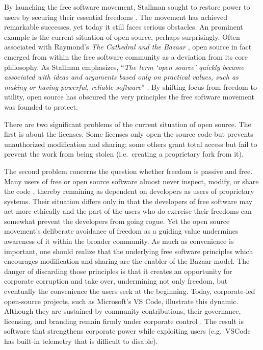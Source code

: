 \documentclass[10pt]{article}
\begin{document}
By launching the free software movement, Stallman sought to restore power to
users by securing their essential freedoms \cite[Essay~1]{stallman.essays}. The
movement has achieved remarkable successes, yet today it still faces serious
obstacles. An prominent example is the current situation of open source,
perhaps surprisingly. Often associated with Raymond’s \emph{The Cathedral and
the Bazaar} \cite{cathedral.bazaar}, open source in fact emerged from within
the free software community as a deviation from its core philosophy. As
Stallman emphasizes, ``\emph{The term `open source' quickly became associated
with ideas and arguments based only on practical values, such as making or
having powerful, reliable software}'' \cite[Essay~14]{stallman.essays}. By
shifting focus from freedom to utility, open source has obscured the very
principles the free software movement was founded to protect.

There are two significant problems of the current situation of open source. The
first is about the licenses. Some licenses only open the source code but
prevents unauthorized modification and sharing; some others grant total
access but fail to prevent the work from being stolen (i.e.\ creating a
proprietary fork from it). 

The second problem concerns the question whether freedom is passive and free.
Many users of free or open source software almost never inspect, modify, or
share the code \cite{open.source.contrib}, thereby remaining as dependent on
developers as users of proprietary systems. Their situation differs only in
that the developers of free software may act more ethically and the part of the
users who do exercise their freedoms can somewhat prevent the developers from
going rogue. Yet the open source movement's deliberate avoidance of freedom as
a guiding value undermines awareness of it within the broader community.  As
much as convenience is important, one should realize that the underlying free
software principles which encourages modification and sharing are the enabler
of the Bazaar model. The danger of discarding those principles is that it
creates an opportunity for corporate corruption and take over, undermining not
only freedom, but eventually the convenience the users seek at the beginning.
Today, corporate-led open-source projects, such as Microsoft's VS Code,
illustrate this dynamic. Although they are sustained by community
contributions, their governance, licensing, and branding remain firmly under
corporate control \cite{corporate.open.source, fake.open.source}.  The result
is software that strengthens corporate power while exploiting users (e.g.\
VSCode has built-in telemetry that is difficult to disable). 
\end{document}

